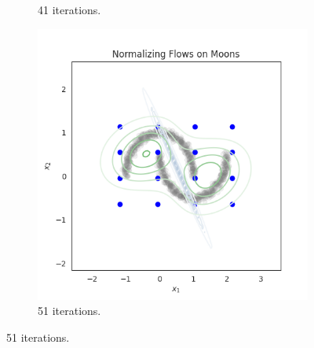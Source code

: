 \documentclass[shortabstract]{iithesis}
\begin{document}
\begin{figure}
\begin{subfigure}{0.32\textwidth}
    \caption{ 41 iterations.}
    \end{subfigure}
    \begin{subfigure}{0.32\textwidth}
    \includegraphics[scale=0.35]{flow_on_moons_5_penalty=0_grid.png}
    \caption{ 51 iterations.}
    \end{subfigure}


\end{figure}
\end{document}
